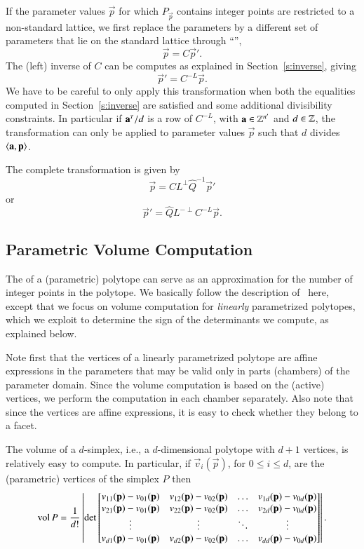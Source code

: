 If the parameter values $\vec p$ for which $P_{\vec p}$ contains integer points
are restricted to a non-standard lattice, we first replace the parameters
by a different set of parameters that lie on the standard lattice
through ``'',
$$
\vec p = C \vec p'
.
$$
The (left) inverse of $C$ can be computes as explained in
Section~\ref{s:inverse}, giving
$$
\vec p' = C^{-L} \vec p
.
$$
We have to be careful to only apply this transformation when
both the equalities computed in Section~\ref{s:inverse} are satisfied
and some additional divisibility constraints.
In particular if $\vec a^\T/d$ is a row of $C^{-L}$, with $\vec a \in \ZZ^{n'}$
and $d \in \mathbb{Z}$, the transformation can only be applied to parameter values
$\vec p$ such that $d$ divides $\sp a p$.

The complete transformation is given by
$$
\vec p = C L^\perp \hat Q^{-1} \vec p'
$$
or
$$
\vec p' = \hat Q L^{-\perp} C^{-L} \vec p
.
$$

\subsection{Parametric Volume Computation}

The  of a (parametric) polytope can serve as an approximation
for the number of integer points in the polytope.
We basically follow the description of~ here, except that we
focus on volume computation for {\em linearly}
parametrized polytopes, which we exploit to determine the sign
of the determinants we compute, as explained below.

Note first that
the vertices of a linearly parametrized polytope are affine expressions
in the parameters that may be valid only in parts (chambers)
of the parameter domain.
Since the volume computation is based on the (active) vertices, we perform
the computation in each chamber separately.
Also note that since the vertices are affine expressions, it is
easy to check whether they belong to a facet.

The volume of a $d$-simplex, i.e., a $d$-dimensional polytope with
$d+1$ vertices, is relatively easy to compute.
In particular, if $\vec v_i(\vec p)$, for $0 \le i \le d$,
are the (parametric) vertices
of the simplex $P$ then
\begin{equation}
\label{eq:volume}
\vol P = 
\frac 1 {d!}
\left|
\det
\begin{bmatrix}
v_{11}(\vec p) - v_{01}(\vec p) &
v_{12}(\vec p) - v_{02}(\vec p) &
\ldots &
v_{1d}(\vec p) - v_{0d}(\vec p)
\\
v_{21}(\vec p) - v_{01}(\vec p) &
v_{22}(\vec p) - v_{02}(\vec p) &
\ldots &
v_{2d}(\vec p) - v_{0d}(\vec p)
\\
\vdots & \vdots & \ddots & \vdots
\\
v_{d1}(\vec p) - v_{01}(\vec p) &
v_{d2}(\vec p) - v_{02}(\vec p) &
\ldots &
v_{dd}(\vec p) - v_{0d}(\vec p)
\end{bmatrix}
\right|.
\end{equation}


